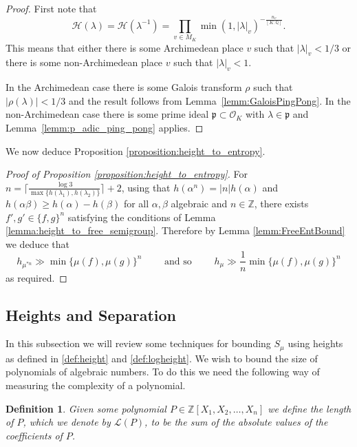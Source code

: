 \documentclass[10pt, english,oneside,reqno]{amsart}
\theoremstyle{plain}
\newtheorem{definition}[theorem]{Definition}
\theoremstyle{remark}
\numberwithin{equation}{section}
\numberwithin{figure}{section}
\newcommand{\Z}{\mathbb{Z}}
\begin{document}
\begin{proof}
    First note that 
    \begin{equation*}
        \mathcal{H}(\lambda) = \mathcal{H}(\lambda^{-1}) = \prod_{v \in M_K} \min(1, |\lambda|_v)^{-\frac{n_v}{[K:\mathbb{Q}]}}.
    \end{equation*}
    This means that either there is some Archimedean  place $v$ such that $| \lambda|_v < 1/3$ or there is some non-Archimedean place $v$ such that $|\lambda |_v <1$.

    In the Archimedean case there is some Galois transform $\rho$ such that $| \rho(\lambda)| < 1/3$ and the result follows from Lemma~\ref{lemm:GaloisPingPong}. In the non-Archimedean case there is some prime ideal $\mathfrak{p} \subset \mathcal{O}_K$ with $\lambda \in \mathfrak{p}$ and Lemma~\ref{lemm:p_adic_ping_pong} applies.
\end{proof}

We now deduce Proposition \ref{proposition:height_to_entropy}.

\begin{proof}[Proof of Proposition \ref{proposition:height_to_entropy}]
    For $n =  \lceil\frac{\log 3}{\max \{ h(\lambda_1), h(\lambda_2) \}}\rceil + 2$, using that $h(\alpha^n) = |n|h(\alpha)$ and $h(\alpha \beta) \geq h(\alpha)- h(\beta)$ for all $\alpha,\beta$ algebraic and $n \in \Z$, there exists $f', g' \in \{f, g \}^n$ satisfying the conditions of Lemma \ref{lemma:height_to_free_semigroup}. Therefore by Lemma \ref{lemm:FreeEntBound} we deduce that
    \begin{equation*}
        h_{\mu^{*n}} \gg \min \{ \mu(f), \mu(g) \}^n \quad\quad \text{ and so } \quad\quad h_{\mu} \gg \frac{1}{n} \min \{ \mu(f), \mu(g) \}^n
    \end{equation*}
    as required.
\end{proof}



\subsection{Heights and Separation}\label{HeightSeparationSection}

In this subsection we will review some techniques for bounding $S_{\mu}$ using heights as defined in \eqref{def:height} and \eqref{def:logheight}. We wish to bound the size of polynomials of algebraic numbers. To do this we need the following way of measuring the complexity of a polynomial.

\begin{definition}
Given some polynomial $P \in \Z [X_1, X_2, \dots, X_n]$ we define the \emph{length} of $P$, which we denote by $\mathcal{L}(P)$, to be the sum of the absolute values of the coefficients of $P$.
\end{definition}
\end{document}
